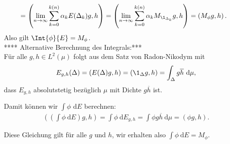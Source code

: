 \begin{solution}
\begin{align*}
  &= \left(\lim_{n \to \infty}\sum_{k=0}^{k(n)}\alpha_kE(\Delta_k)g,h\right)
  = \left(\lim_{n \to \infty}\sum_{k=0}^{k(n)}\alpha_kM_{\1_{\Delta_k}}g,h\right)
  = \left(M_{\phi}g,h\right).
\end{align*}
Also gilt $\Int{\phi}{E} = M_{\phi}$. \\
**** Alternative Berechnung des Integrals:*** \\
Für alle $g, h \in L^2(\mu)$ folgt aus dem Satz von Radon-Nikodym mit
\begin{align*}
    E_{g, h}(\Delta) = (E(\Delta) g, h) = (\1_\Delta g, h) = \int_{\Delta} g \overline h~\mathrm{d} \mu,
\end{align*}
dass $E_{g, h}$ absolutstetig bezüglich $\mu$ mit Dichte $g\overline h$ ist.

Damit können wir $\int \phi$ d$E$ berechnen:
\begin{align*}
    \left(\left(\int \phi ~\mathrm{d}E\right)g, h\right) =
    \int \phi ~\mathrm{d}E_{g,h} = \int \phi g \overline h~\mathrm{d} \mu = (\phi g, h).
\end{align*}

Diese Gleichung gilt für alle $g$ und $h$, wir erhalten also $\int \phi ~\mathrm{d}E = M_\phi$.
\end{solution}
